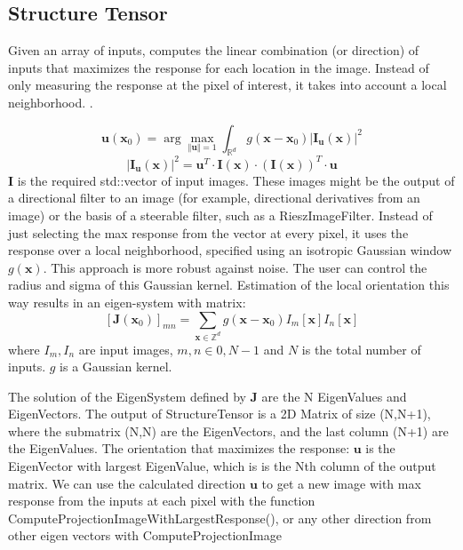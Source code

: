 \subsection{Structure Tensor}
\label{sub:structure_tensor_impl}

Given an array of inputs,  \cite{unser_steerable_2011} computes the linear combination (or direction) of inputs that maximizes the response for each location in the image. Instead of only measuring the response at the pixel of interest, it takes into account a local neighborhood. \cite{unser_steerable_2011}.

$$
 \mathbf{u}({\mathbf{x}_0}) = \arg \max_{\Vert\mathbf{u}\Vert =1 }  \int_{\mathbb{R}^d} g(\mathbf{x} - \mathbf{x}_0) \left| \mathbf{I}_{\mathbf{u}}(\mathbf{x})\right|^2
$$
$$
 \left| \mathbf{I}_{\mathbf{u}}(\mathbf{x})\right|^2 =
 \mathbf{u}^T \cdot \mathbf{I}(\mathbf{x}) \cdot (\mathbf{I}(\mathbf{x}))^T \cdot \mathbf{u}
$$
 $ \mathbf{I}$ is the required std::vector of input images. These images might be the output of a directional filter to an image
 (for example, directional derivatives from an image) or the basis of a steerable filter, such as a RieszImageFilter.
 Instead of just selecting the max response from the vector at every pixel, it uses the response over
 a local neighborhood, specified using an isotropic Gaussian window $g(\mathbf{x})$.
 This approach is more robust against noise. The user can control the radius and sigma of this Gaussian kernel.
 Estimation of the local orientation this way results in an eigen-system with matrix:
 $$
 [\mathbf{J}(\mathbf{x}_0)]_{mn} = \sum_{\mathbf{x} \in \mathbb{Z}^d} g(\mathbf{x} - \mathbf{x}_0) I_m[\mathbf{x}]I_n[\mathbf{x}]
 $$
 where $I_m, I_n $ are input images, $ m,n \in {0,N-1} $ and $N$ is the total number of inputs.
 $g$ is a Gaussian kernel.

 The solution of the EigenSystem defined by $\mathbf{J}$ are the N EigenValues and EigenVectors.
 The output of StructureTensor is a 2D Matrix of size (N,N+1), where the submatrix (N,N) are the EigenVectors, and the last column (N+1) are the EigenValues.
 The orientation that maximizes the response: $\bm{u}$ is the EigenVector with largest EigenValue, which is is the Nth column of the output matrix.
 We can use the calculated direction $\bm{u}$ to get a new image with max response from the inputs at each pixel with the function ComputeProjectionImageWithLargestResponse(),
 or any other direction from other eigen vectors with ComputeProjectionImage

